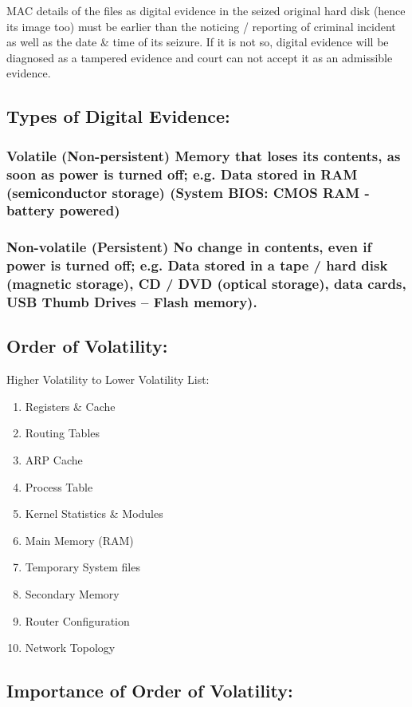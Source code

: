 \documentclass[british]{article}
\begin{document}
MAC details of the files as digital evidence in the seized original
hard disk (hence its image too) must be earlier than the noticing
/ reporting of criminal incident as well as the date \& time of its
seizure. If it is not so, digital evidence will be diagnosed as a
tampered evidence and court can not accept it as an admissible evidence.

\subsection{Types of Digital Evidence:}

\subsubsection{Volatile (Non-persistent) Memory that loses its contents, as soon
as power is turned off; e.g. Data stored in RAM (semiconductor storage)
(System BIOS: CMOS RAM - battery powered) }

\subsubsection{Non-volatile (Persistent) No change in contents, even if power is
turned off; e.g. Data stored in a tape / hard disk (magnetic storage),
CD / DVD (optical storage), data cards, USB Thumb Drives -- Flash
memory).}

\subsection{Order of Volatility:}

Higher Volatility to Lower Volatility List:
\begin{enumerate}
\item Registers \& Cache
\item Routing Tables
\item ARP Cache
\item Process Table
\item Kernel Statistics \& Modules
\item Main Memory (RAM)
\item Temporary System files
\item Secondary Memory
\item Router Configuration
\item Network Topology
\end{enumerate}

\subsection{Importance of Order of Volatility:}
\end{document}
